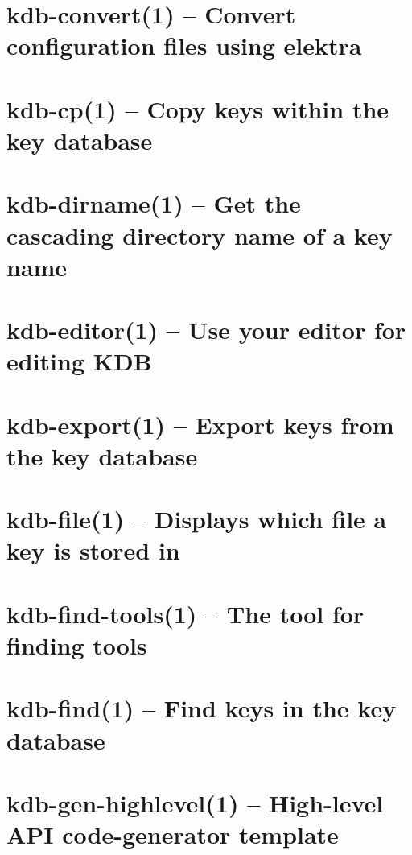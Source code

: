 \let\mypdfximage\pdfximage\def\pdfximage{\immediate\mypdfximage}\documentclass[twoside]{book}
\newcommand{\+}{\discretionary{\mbox{\scriptsize$\hookleftarrow$}}{}{}}
\begin{document}
\chapter{kdb-\/convert(1) -- Convert configuration files using elektra}
\label{doc_help_kdb-convert_md}

\chapter{kdb-\/cp(1) -- Copy keys within the key database}
\label{doc_help_kdb-cp_md}

\chapter{kdb-\/dirname(1) -- Get the cascading directory name of a key name}
\label{doc_help_kdb-dirname_md}

\chapter{kdb-\/editor(1) -- Use your editor for editing KDB}
\label{doc_help_kdb-editor_md}

\chapter{kdb-\/export(1) -- Export keys from the key database}
\label{doc_help_kdb-export_md}

\chapter{kdb-\/file(1) -- Displays which file a key is stored in}
\label{doc_help_kdb-file_md}

\chapter{kdb-\/find-\/tools(1) -- The tool for finding tools}
\label{doc_help_kdb-find-tools_md}

\chapter{kdb-\/find(1) -- Find keys in the key database}
\label{doc_help_kdb-find_md}

\chapter{kdb-\/gen-\/highlevel(1) -- High-\/level API code-\/generator template}
\label{doc_help_kdb-gen-highlevel_md}

\end{document}
